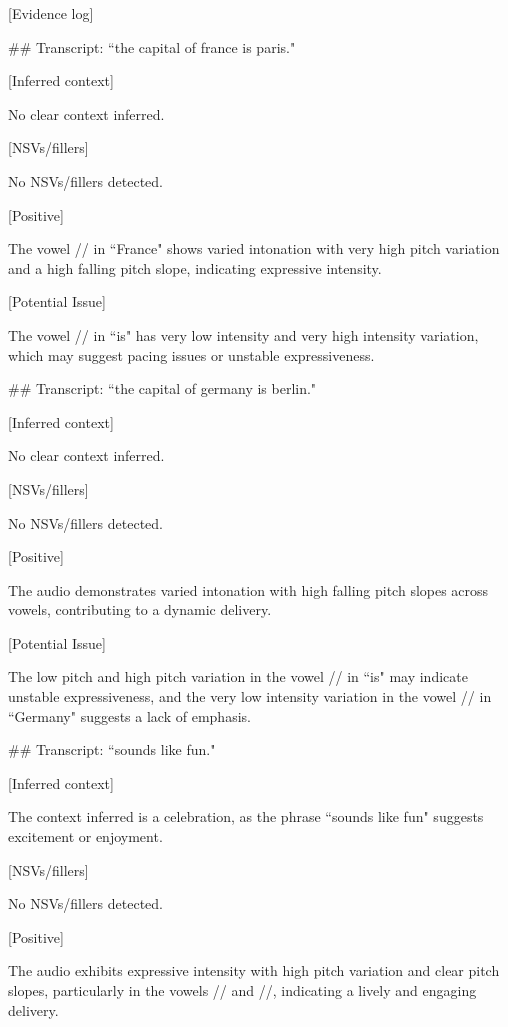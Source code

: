 \begin{tcolorbox}[blue_box, title = {{Audio Sample 2 : Ground-truth Human-likeness Rating = 3.0}}]\footnotesize
[Evidence log]

\#\# Transcript: ``the capital of france is paris."

[Inferred context]  

No clear context inferred.


[NSVs/fillers]  

No NSVs/fillers detected.


[Positive]  

The vowel // in ``France" shows varied intonation with very high pitch variation and a high falling pitch slope, indicating expressive intensity.


[Potential Issue]  

The vowel // in ``is" has very low intensity and very high intensity variation, which may suggest pacing issues or unstable expressiveness.


\#\# Transcript: ``the capital of germany is berlin."

[Inferred context]  

No clear context inferred.


[NSVs/fillers]  

No NSVs/fillers detected.


[Positive]  

The audio demonstrates varied intonation with high falling pitch slopes across vowels, contributing to a dynamic delivery.


[Potential Issue]  

The low pitch and high pitch variation in the vowel // in ``is" may indicate unstable expressiveness, and the very low intensity variation in the vowel // in ``Germany" suggests a lack of emphasis.


\#\# Transcript: ``sounds like fun."

[Inferred context]  

The context inferred is a celebration, as the phrase ``sounds like fun" suggests excitement or enjoyment.


[NSVs/fillers]  

No NSVs/fillers detected.


[Positive]  

The audio exhibits expressive intensity with high pitch variation and clear pitch slopes, particularly in the vowels // and //, indicating a lively and engaging delivery.



\end{tcolorbox}
